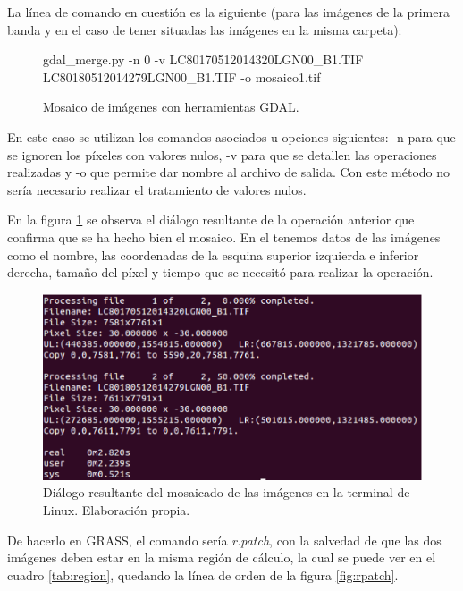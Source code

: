 La línea de comando en cuestión es la siguiente (para las imágenes de la primera banda y en el caso de tener situadas las imágenes en la misma carpeta):

\begin{figure}[ht]
\centering
\begin{boxedverbatim}
	gdal_merge.py -n 0 -v LC80170512014320LGN00_B1.TIF 
	LC80180512014279LGN00_B1.TIF -o mosaico1.tif
\end{boxedverbatim}
\caption[Mosaico de imágenes]{Mosaico de imágenes con herramientas GDAL.}
\end{figure}

En este caso se utilizan los comandos asociados u opciones siguientes: -n para que se ignoren los píxeles con valores nulos, -v para que se detallen las operaciones realizadas y -o que permite dar nombre al archivo de salida. Con este método no sería necesario realizar el tratamiento de valores nulos.%

En la figura \ref{fig:dialogomosaico} se observa el diálogo resultante de la operación anterior que confirma que se ha hecho bien el mosaico. En el tenemos datos de las imágenes como el nombre, las coordenadas de la esquina superior izquierda e inferior derecha, tamaño del píxel y tiempo que se necesitó para realizar la operación.%

\begin{figure}
	\centering
	\includegraphics[width=0.8\linewidth]{./Imagenes/Dialogo_mosaico.eps}
	\caption[Diálogo del mosaicado]{Diálogo resultante del mosaicado de las imágenes en la terminal de Linux. Elaboración propia.}
	\label{fig:dialogomosaico}
\end{figure}

De hacerlo en GRASS, el comando sería \textit{r.patch}, con la salvedad de que las dos imágenes deben estar en la misma región de cálculo, la cual se puede ver en el cuadro \ref{tab:region}, quedando la línea de orden de la figura \ref{fig:rpatch}.

